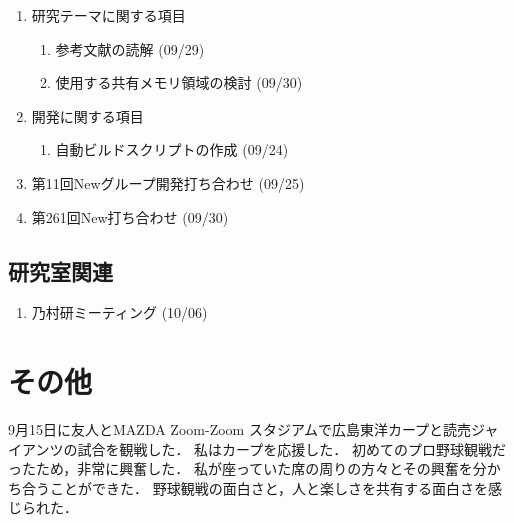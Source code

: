\documentclass[fleqn, 14pt]{extarticle}
\begin{document}
\begin{enumerate}
\item 研究テーマに関する項目
\hfill
\begin{enumerate}


\item 参考文献の読解
\hfill
(09/29)

\item 使用する共有メモリ領域の検討
\hfill
(09/30)


\end{enumerate}
\item 開発に関する項目
\hfill
\begin{enumerate}

\item 自動ビルドスクリプトの作成
\hfill
(09/24)

\end{enumerate}
\item 第11回Newグループ開発打ち合わせ
\hfill
\label{enum-7}
(09/25)
\item 第261回New打ち合わせ
\hfill
\label{enum-3}
(09/30)
\end{enumerate}

\subsection{研究室関連}
\label{sec-4-2}

\begin{enumerate}



\item 乃村研ミーティング
\hfill
\label{enum-8}
(10/06)
\end{enumerate}


\section{その他}
9月15日に友人とMAZDA Zoom-Zoom スタジアムで広島東洋カープと読売ジャイアンツの試合を観戦した．
私はカープを応援した．
初めてのプロ野球観戦だったため，非常に興奮した．
私が座っていた席の周りの方々とその興奮を分かち合うことができた．
野球観戦の面白さと，人と楽しさを共有する面白さを感じられた．
\end{document}

